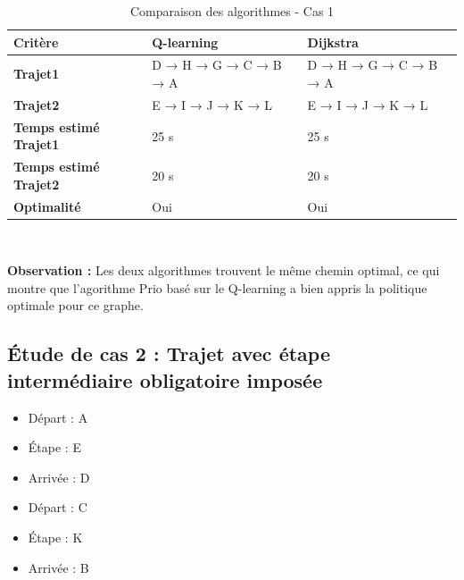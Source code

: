\documentclass{article}
\begin{document}
\begin{table}[H]
    \centering
    \begin{tabular}{|l|l|l|}
        \hline
        \textbf{Critère} & \textbf{Q-learning} & \textbf{Dijkstra} \\
        \hline
        \textbf{Trajet1} & D → H → G → C → B → A & D → H → G → C → B → A \\
       \hline
        \textbf{Trajet2} & E → I → J → K → L& E → I → J → K → L \\
	\hline
        \textbf{Temps estimé Trajet1 } & 25 s & 25 s \\
       \hline
	\textbf{Temps estimé Trajet2 } & 20 s & 20 s \\
   	 \hline
        \textbf{Optimalité} & Oui & Oui \\
        \hline
    \end{tabular}  \\ 
    \caption{Comparaison des algorithmes - Cas 1}
\vspace{0.25cm} 
\hspace{1cm} 
\textbf{Observation :} Les deux algorithmes trouvent le même chemin optimal, ce qui montre que l'agorithme Prio basé sur le Q-learning a bien appris la politique optimale pour ce graphe.

\end{table}

\subsection{Étude de cas 2 : Trajet avec étape intermédiaire obligatoire imposée}
\begin{itemize}
    \item Départ : A
    \item Étape : E
    \item Arrivée : D
\end{itemize}

\begin{itemize}
    \item Départ : C
    \item Étape : K
    \item Arrivée : B
\end{itemize}
\end{document}
